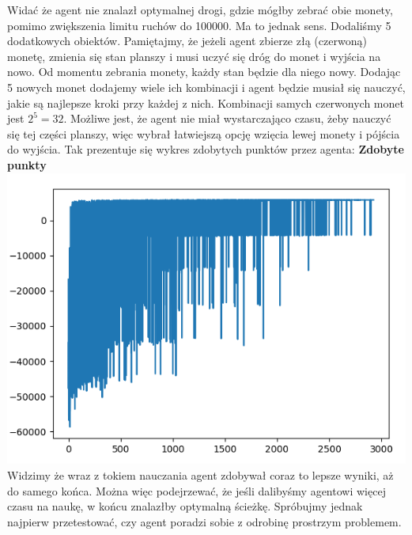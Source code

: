 \documentclass[a4paper,12pt]{article}
\begin{document}
Widać że agent nie znalazł optymalnej drogi, gdzie mógłby zebrać obie monety, pomimo zwiększenia limitu ruchów do 100000. Ma to jednak sens. Dodaliśmy 5 dodatkowych obiektów. Pamiętajmy, że jeżeli agent zbierze złą (czerwoną) monetę, zmienia się stan planszy i musi uczyć się dróg do monet i wyjścia na nowo. Od momentu zebrania monety, każdy stan będzie dla niego nowy. Dodając 5 nowych monet dodajemy wiele ich kombinacji i agent będzie musiał się nauczyć, jakie są najlepsze kroki przy każdej z nich. Kombinacji samych czerwonych monet jest \(2^5 = 32\). Możliwe jest, że agent nie miał wystarczająco czasu, żeby nauczyć się tej części planszy, więc wybrał łatwiejszą opcję wzięcia lewej monety i pójścia do wyjścia. Tak prezentuje się wykres zdobytych punktów przez agenta: \newline \newline
\textbf{\Large{Zdobyte punkty}} \newline
\includegraphics[scale=0.9]{testy/wykres2.png}
\newline \newline Widzimy że wraz z tokiem nauczania agent zdobywał coraz to lepsze wyniki, aż do samego końca. Można więc podejrzewać, że jeśli dalibyśmy agentowi więcej czasu na naukę, w końcu znalazłby optymalną ścieżkę. Spróbujmy jednak najpierw przetestować, czy agent poradzi sobie z odrobinę prostrzym problemem.
\end{document}
